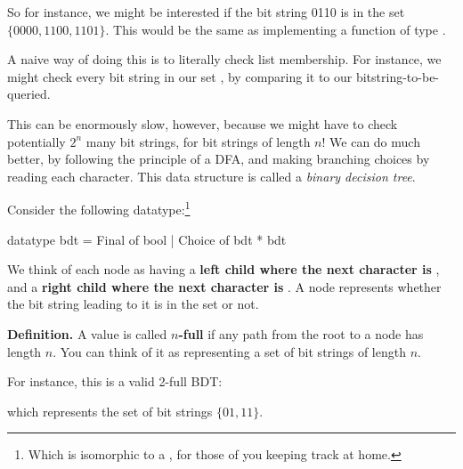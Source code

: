 So for instance, we might be interested if the bit string 0110 is in the set $\{
0000, 1100, 1101 \}$. This would be the same as implementing a function of type
.

A naive way of doing this is to literally check list membership. For instance,
we might check every bit string in our set
, by comparing it to our bitstring-to-be-queried.

This can be enormously slow, however, because we might have to check potentially
$2^n$ many bit strings, for bit strings of length $n$! We can do much
better, by following the principle of a DFA, and making branching choices
by reading each character. This data structure is called a \textit{binary decision tree}.

Consider the following datatype:\footnote{Which is isomorphic to a , for
those of you keeping track at home.}
\begin{codeblock}
  datatype bdt =
      Final of bool
    | Choice of bdt * bdt
\end{codeblock}

We think of each  node as having a \textbf{left child where the next character
is }, and a \textbf{right child where the next character is }. A
 node represents whether the bit string leading to it is
in the set or not.

\textbf{Definition.} A value  is called \textbf{$n$-full} if
any path from the root to a  node has length $n$. You can think of
it as representing a set of bit strings of length $n$.

For instance, this is a valid 2-full BDT:

\begin{center}
\end{center}

which represents the set of bit strings $\{ 01, 11 \}$.

\newpage

